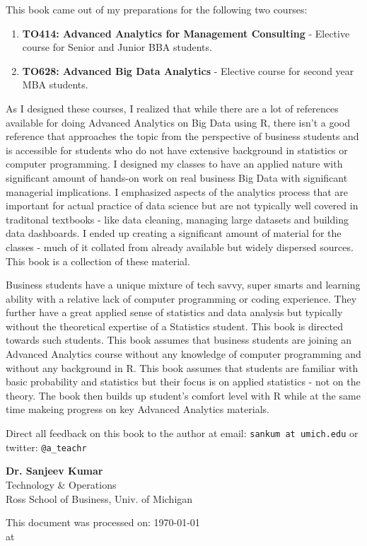 \documentclass[11pt, letterpaper, twoside]{memoir}\usepackage{knitr}
\newcommand{\chapterendsymbol}{
    \vspace{24pt}
    \Huge
    \hrulefill \hspace{0.1in} \hspace{0.1in} \hrulefill
    \normalsize
    }
\begin{document}
This book came out of my preparations for the following two courses:
\begin{enumerate}
\item \textbf{TO414: Advanced Analytics for Management Consulting} - Elective course for Senior and Junior BBA students. 
\item \textbf{TO628: Advanced Big Data Analytics} - Elective course for second year MBA students.
\end{enumerate}

As I designed these courses, I realized that while there are a lot of references available for doing Advanced Analytics on Big Data using R, there isn't a good reference that approaches the topic from the perspective of business students and is accessible for students who do not have extensive background in statistics or computer programming. I designed my classes to have an applied nature with significant amount of hands-on work on real business Big Data with significant managerial implications. I emphasized aspects of the analytics process that are important for actual practice of data science but are not typically well covered in traditonal textbooks - like data cleaning, managing large datasets and building data dashboards. I ended up creating a significant amount of material for the classes - much of it collated from already available but widely dispersed sources. This book is a collection of these material.

Business students have a unique mixture of tech savvy, super smarts and learning ability with a relative lack of computer programming or coding experience. They further have a great applied sense of statistics and data analysis but typically without the theoretical expertise of a Statistics student. This book is directed towards such students. This book assumes that business students are joining an Advanced Analytics course without any knowledge of computer programming and without any background in R. This book assumes that students are familiar with basic probability and statistics but their focus is on applied statistics - not on the theory. The book then builds up student's comfort level with R while at the same time makeing progress on key Advanced Analytics materials.

Direct all feedback on this book to the author at email: \texttt{sankum at umich.edu} or twitter: \texttt{@a\_teachr}

\vspace{12pt}

\begin{flushright}
\textbf{Dr. Sanjeev Kumar} \\
Technology \& Operations \\
Ross School of Business, Univ. of Michigan

This document was processed on: \today \\ at \printtime
\end{flushright}
\chapterendsymbol
\end{document}
